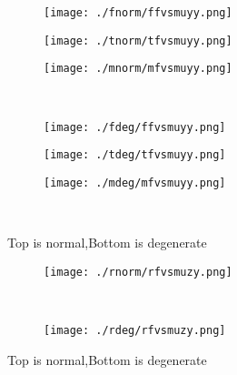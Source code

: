 \documentclass[aps,floats,floatfix,nofootinbib]{revtex4-1}
\begin{document}
\begin{center}
\begin{figure}
\begin{subfigure}{0.3\textwidth}
\texttt{[image: ./fnorm/ffvsmuyy.png]}
\label{}
\end{subfigure}
\begin{subfigure}{0.3\textwidth}
\texttt{[image: ./tnorm/tfvsmuyy.png]}
\label{}
\end{subfigure}
\begin{subfigure}{0.3\textwidth}
\texttt{[image: ./mnorm/mfvsmuyy.png]}
\label{}
\end{subfigure}\\
\begin{subfigure}{0.3\textwidth}
\texttt{[image: ./fdeg/ffvsmuyy.png]}
\label{}
\end{subfigure}
\begin{subfigure}{0.3\textwidth}
\texttt{[image: ./tdeg/tfvsmuyy.png]}
\label{}
\end{subfigure}
\begin{subfigure}{0.3\textwidth}
\texttt{[image: ./mdeg/mfvsmuyy.png]}
\label{}
\end{subfigure}\\
\caption{Top is normal,Bottom is degenerate}
\end{figure}
\end{center}

\begin{center}
\begin{figure}
\begin{subfigure}{0.95\textwidth}
\texttt{[image: ./rnorm/rfvsmuzy.png]}
\label{}
\end{subfigure}\\
\begin{subfigure}{0.95\textwidth}
\texttt{[image: ./rdeg/rfvsmuzy.png]}
\label{}
\end{subfigure}
\caption{Top is normal,Bottom is degenerate}
\end{figure}
\end{center}
\end{document}
